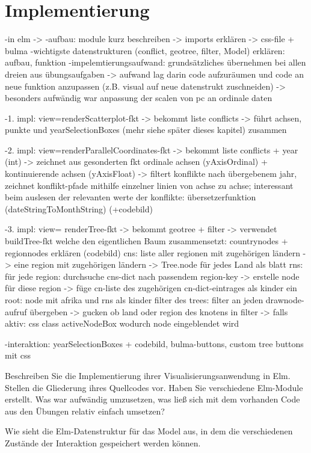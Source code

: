 \documentclass[usegeometry=true]{scrartcl}
\begin{document}
\section{Implementierung}

-in elm ->
-aufbau: module kurz beschreiben -> imports erklären -> css-file + bulma
-wichtigste datenstrukturen (conflict, geotree, filter, Model) erklären: aufbau, funktion
-impelemtierungsaufwand: grundsätzliches übernehmen bei allen dreien aus übungsaufgaben -> aufwand lag darin code aufzuräumen und code an neue funktion anzupassen (z.B. visual auf neue datenstrukt zuschneiden) -> besonders aufwändig war anpassung der scalen von pc an ordinale daten

-1. impl: view=renderScatterplot-fkt -> bekommt liste conflicts -> führt achsen, punkte und yearSelectionBoxes (mehr siehe später dieses kapitel) zusammen

-2. impl: view=renderParallelCoordinates-fkt -> bekommt liste conflicts + year (int) -> zeichnet aus gesonderten fkt ordinale achsen (yAxisOrdinal) + kontinuierende achsen (yAxisFloat) -> filtert konflikte nach übergebenem jahr, zeichnet konflikt-pfade mithilfe einzelner linien von achse zu achse; interessant beim auslesen der relevanten werte der konflikte: übersetzerfunktion (dateStringToMonthString) (+codebild)

-3. impl: view= renderTree-fkt -> bekommt geotree + filter -> verwendet buildTree-fkt welche den eigentlichen Baum zusammensetzt: countrynodes + regionnodes erklären (codebild)
cns: liste aller regionen mit zugehörigen ländern -> eine region mit zugehörigen ländern -> Tree.node für jedes Land als blatt
rns: für jede region: durchsuche cns-dict nach passendem region-key -> erstelle node für diese region -> füge cn-liste des zugehörigen cn-dict-eintrages als kinder ein
root: node mit afrika und rns als kinder
filter des trees: filter an jeden drawnode-aufruf übergeben -> gucken ob land oder region des knotens in filter -> falls aktiv: css class activeNodeBox wodurch node eingeblendet wird
 
-interaktion: yearSelectionBoxes + codebild, bulma-buttons, custom tree buttons mit css


Beschreiben Sie die Implementierung ihrer Visualisierungsanwendung in Elm. Stellen die Gliederung ihres Quellcodes vor. Haben Sie verschiedene Elm-Module erstellt. Was war aufwändig umzusetzen, was ließ sich mit dem vorhanden Code aus den Übungen relativ einfach umsetzen?

Wie sieht die Elm-Datenstruktur für das Model aus, in dem die verschiedenen Zustände der Interaktion gespeichert werden können.
\end{document}
